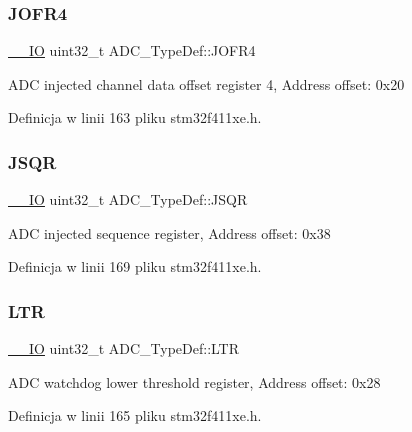 \subsubsection{\texorpdfstring{J\+O\+F\+R4}{JOFR4}}
{\footnotesize\ttfamily \hyperlink{core__sc300_8h_aec43007d9998a0a0e01faede4133d6be}{\+\_\+\+\_\+\+IO} uint32\+\_\+t A\+D\+C\+\_\+\+Type\+Def\+::\+J\+O\+F\+R4}

A\+DC injected channel data offset register 4, Address offset\+: 0x20 

Definicja w linii 163 pliku stm32f411xe.\+h.

\mbox{\label{struct_a_d_c___type_def_a5438a76a93ac1bd2526e92ef298dc193}} 
\subsubsection{\texorpdfstring{J\+S\+QR}{JSQR}}
{\footnotesize\ttfamily \hyperlink{core__sc300_8h_aec43007d9998a0a0e01faede4133d6be}{\+\_\+\+\_\+\+IO} uint32\+\_\+t A\+D\+C\+\_\+\+Type\+Def\+::\+J\+S\+QR}

A\+DC injected sequence register, Address offset\+: 0x38 

Definicja w linii 169 pliku stm32f411xe.\+h.

\mbox{\label{struct_a_d_c___type_def_afdaf8050fb01739206a92c9ad610f396}} 
\subsubsection{\texorpdfstring{L\+TR}{LTR}}
{\footnotesize\ttfamily \hyperlink{core__sc300_8h_aec43007d9998a0a0e01faede4133d6be}{\+\_\+\+\_\+\+IO} uint32\+\_\+t A\+D\+C\+\_\+\+Type\+Def\+::\+L\+TR}

A\+DC watchdog lower threshold register, Address offset\+: 0x28 

Definicja w linii 165 pliku stm32f411xe.\+h.

\mbox{\label{struct_a_d_c___type_def_a73009a8122fcc628f467a4e997109347}} 
